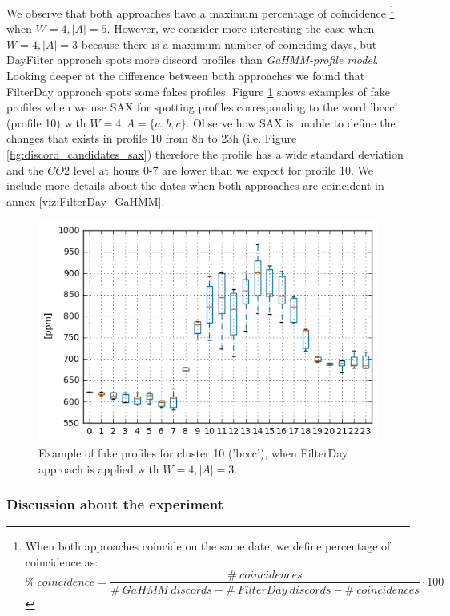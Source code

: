 We observe that both approaches have a maximum percentage of coincidence 
\footnote{When both approaches coincide on the same date, we define percentage of coincidence as: \\
$
	\% \ coincidence = \dfrac{\# \ coincidences}{\#\ GaHMM \ discords + \# \ FilterDay \ discords - \# \ coincidences} \cdot 100
$ } 
when $W=4, |A|= 5$. However, we consider more interesting the case when $W=4, |A|= 3$ because there is a maximum number of coinciding days, but DayFilter approach spots more discord profiles than \textit{GaHMM-profile model}. Looking deeper at the difference between both approaches we found that FilterDay approach spots some fakes profiles. Figure \ref{fig:fake_candidates} shows examples of fake profiles when we use SAX for spotting profiles corresponding to the word 'bccc' (profile 10) with $W=4, A=\{ a, b, c\}$. Observe how SAX is unable to define the changes that exists in profile 10 from 8h to 23h (i.e. Figure \ref{fig:discord_candidates_sax}) therefore the profile has a wide standard deviation and the $CO2$ level at hours 0-7 are lower than we expect for profile 10. We include more details about the dates when both approaches are coincident in annex \ref{viz:FilterDay_GaHMM}.  

\begin{figure}[h!]
  \vspace{0.5em} %
  \includegraphics[scale=0.7]{Figures/fake_candidates.jpg}
  \caption{Example of fake profiles for cluster 10 ('bccc'), when FilterDay approach is applied with $W=4, |A|=3$.}
  \label{fig:fake_candidates}
\end{figure}

\subsubsection{Discussion about the experiment}

